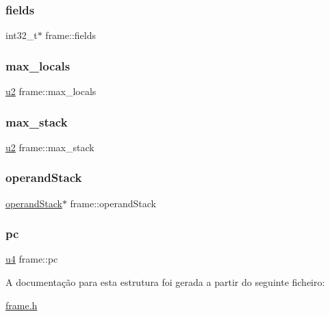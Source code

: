 \mbox{\label{structframe_abd74d70b2c953c57da3820ef8bfd152f}} 
\subsubsection{\texorpdfstring{fields}{fields}}
{\footnotesize\ttfamily int32\+\_\+t$\ast$ frame\+::fields}

\mbox{\label{structframe_a2f8c0cb2b381617b0065066918344dbf}} 
\subsubsection{\texorpdfstring{max\+\_\+locals}{max\_locals}}
{\footnotesize\ttfamily \hyperlink{util_8h_a55ef8d87fd202b8417704c089899c5b9}{u2} frame\+::max\+\_\+locals}

\mbox{\label{structframe_a0c15fcc6d1f7224dddf9e6539c8cf9d3}} 
\subsubsection{\texorpdfstring{max\+\_\+stack}{max\_stack}}
{\footnotesize\ttfamily \hyperlink{util_8h_a55ef8d87fd202b8417704c089899c5b9}{u2} frame\+::max\+\_\+stack}

\mbox{\label{structframe_a2247e2a31594f7c5b3f6de0f6dc4ca18}} 
\subsubsection{\texorpdfstring{operand\+Stack}{operandStack}}
{\footnotesize\ttfamily \hyperlink{structoperand_stack}{operand\+Stack}$\ast$ frame\+::operand\+Stack}

\mbox{\label{structframe_ae2f8c8d0abb0ff0952fb8ab971c2d3d0}} 
\subsubsection{\texorpdfstring{pc}{pc}}
{\footnotesize\ttfamily \hyperlink{util_8h_ae391a1d79bb0c8cbc283f0283e3c098b}{u4} frame\+::pc}



A documentação para esta estrutura foi gerada a partir do seguinte ficheiro\+:\begin{DoxyCompactItemize}
\item 
\hyperlink{frame_8h}{frame.\+h}\end{DoxyCompactItemize}
